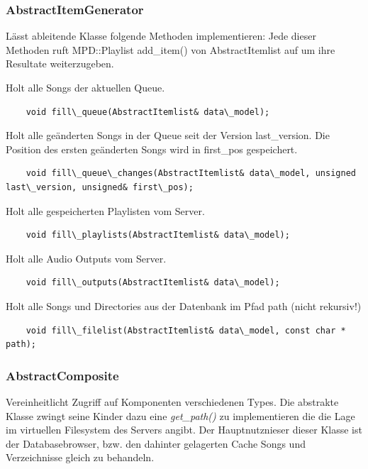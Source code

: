 

\subsubsection{AbstractItemGenerator}
Lässt ableitende Klasse folgende Methoden implementieren:
Jede dieser Methoden ruft MPD::Playlist add\_item() von AbstractItemlist auf um ihre Resultate weiterzugeben.

Holt alle Songs der aktuellen Queue.
\begin{verbatim}            
    void fill\_queue(AbstractItemlist& data\_model);
\end{verbatim}

Holt alle geänderten Songs in der Queue seit der Version last\_version. Die Position des ersten geänderten Songs wird in first\_pos gespeichert. 
\begin{verbatim}
    void fill\_queue\_changes(AbstractItemlist& data\_model, unsigned last\_version, unsigned& first\_pos);
\end{verbatim}

Holt alle gespeicherten Playlisten vom Server.
\begin{verbatim}              
    void fill\_playlists(AbstractItemlist& data\_model);
\end{verbatim}

Holt alle Audio Outputs vom Server.
\begin{verbatim}
    void fill\_outputs(AbstractItemlist& data\_model);
\end{verbatim}

Holt alle Songs und Directories aus der Datenbank im Pfad path (nicht rekursiv!)              
\begin{verbatim}
    void fill\_filelist(AbstractItemlist& data\_model, const char * path);
\end{verbatim}



\subsubsection{AbstractComposite}
Vereinheitlicht Zugriff auf Komponenten verschiedenen Types.
Die abstrakte Klasse zwingt seine Kinder dazu eine \emph{get\_path()} zu implementieren die die Lage im virtuellen Filesystem des Servers angibt.
Der Hauptnutznieser dieser Klasse ist der Databasebrowser, bzw. den dahinter gelagerten Cache Songs und Verzeichnisse gleich zu behandeln.

